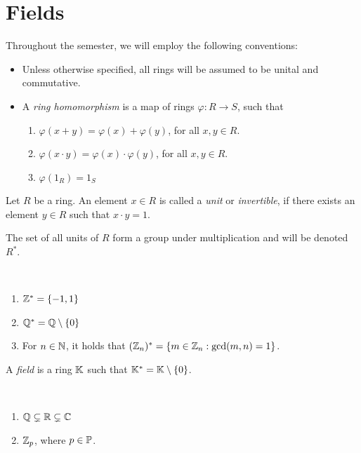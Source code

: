 \section{Fields}

Throughout the semester, we will employ the following conventions:
\begin{itemize}
    \item Unless otherwise specified, all rings will be assumed to be unital and commutative.
    \item A \emph{ring homomorphism} is a map of rings $\varphi : R \to S$, such that
    \begin{enumerate}
        \item $\varphi(x+y) = \varphi(x) + \varphi(y)$, for all $x, y \in R$.
        \item $\varphi(x \cdot y) = \varphi(x) \cdot \varphi(y)$, for all $x, y \in R$.
        \item $\varphi(1_R) = 1_S$
    \end{enumerate}
\end{itemize}

\begin{definition}
    Let $R$ be a ring. An element $x \in R$ is called a \emph{unit} or \emph{invertible}, if there exists an element $y \in R$ such that $x \cdot y = 1$.
\end{definition}

The set of all units of $R$ form a group under multiplication and will be denoted $R^*$.

\begin{example}{\ }
    \begin{enumerate}
        \item $\Z^* = \{ -1, 1 \}$
        \item $\Q^* = \Q \setminus \{0\}$
        \item For $n \in \N$, it holds that $(\Z_n)^* = \{ m \in \Z_n : \gcd(m,n) = 1 \}$.
    \end{enumerate}
\end{example}

\begin{definition}
    A \emph{field} is a ring $\K$ such that $\K^* = \K \setminus \{0\}$.
\end{definition}

\begin{example}{\ }
    \begin{enumerate}
        \item $\Q \subsetneq \R \subsetneq \C$
        \item $\Z_p$, where $p \in \P$.
    \end{enumerate}
\end{example}

